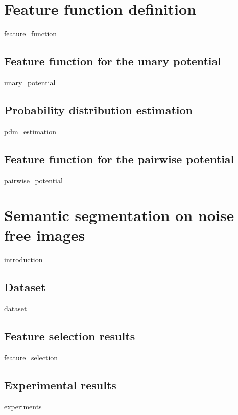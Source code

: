 \documentclass[12pt]{report}
\begin{document}
    \section{Feature function definition}
    {feature_function}
    
        \subsection{Feature function for the unary potential}
        \label{sec:nonlinear_unary_potential}
        {unary_potential}
        
        \subsection{Probability distribution estimation}
        {pdm_estimation}
        
        \subsection{Feature function for the pairwise potential}
        {pairwise_potential}
        
    \section{Semantic segmentation on noise free images}
    {introduction} 
        
        \subsection{Dataset}
        {dataset}
     
        \subsection{Feature selection results}
        \label{sec:feature_selection_noise_free}
        {feature_selection}
        
        \subsection{Experimental results}	
            {experiments}
    
\end{document}

